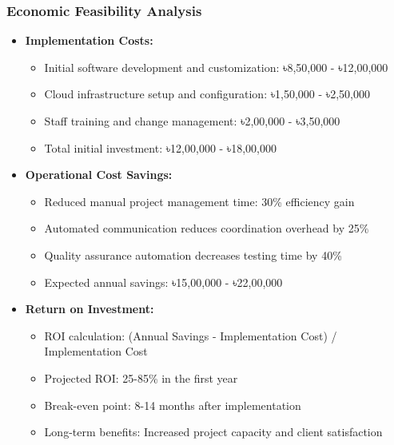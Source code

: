 \documentclass[12pt,a4paper]{article}
\begin{document}
\subsubsection{Economic Feasibility Analysis}
\begin{itemize}
    \item \textbf{Implementation Costs:}
    \begin{itemize}
        \item Initial software development and customization: ৳8,50,000 - ৳12,00,000
        \item Cloud infrastructure setup and configuration: ৳1,50,000 - ৳2,50,000
        \item Staff training and change management: ৳2,00,000 - ৳3,50,000
        \item Total initial investment: ৳12,00,000 - ৳18,00,000
    \end{itemize}
    
    \item \textbf{Operational Cost Savings:}
    \begin{itemize}
        \item Reduced manual project management time: 30\% efficiency gain
        \item Automated communication reduces coordination overhead by 25\%
        \item Quality assurance automation decreases testing time by 40\%
        \item Expected annual savings: ৳15,00,000 - ৳22,00,000
    \end{itemize}
    
    \item \textbf{Return on Investment:}
    \begin{itemize}
        \item ROI calculation: (Annual Savings - Implementation Cost) / Implementation Cost
        \item Projected ROI: 25-85\% in the first year
        \item Break-even point: 8-14 months after implementation
        \item Long-term benefits: Increased project capacity and client satisfaction
    \end{itemize}
\end{itemize}
\end{document}
